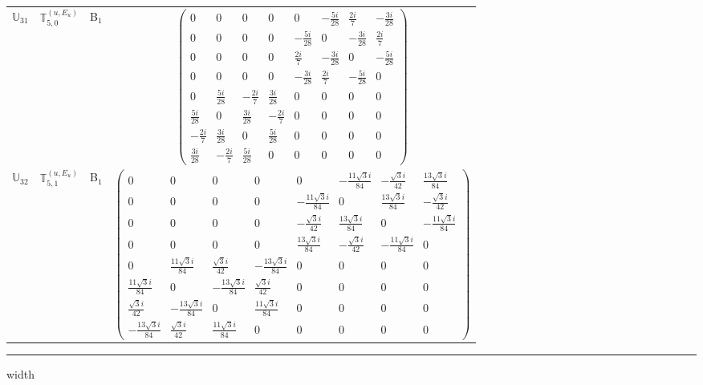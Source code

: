 \documentclass[fleqn,10pt,landscape]{article}
\begin{document}
\begin{itemize}
\begin{center}
\begin{longtable}{c|c|c|c}
$ \mathbb{U}_{31} $ & $\mathbb{T}_{5,0}^{(u,E_{u})}$ & B$_{1}$ & $\begin{pmatrix} 0 & 0 & 0 & 0 & 0 & - \frac{5 i}{28} & \frac{2 i}{7} & - \frac{3 i}{28} \\ 0 & 0 & 0 & 0 & - \frac{5 i}{28} & 0 & - \frac{3 i}{28} & \frac{2 i}{7} \\ 0 & 0 & 0 & 0 & \frac{2 i}{7} & - \frac{3 i}{28} & 0 & - \frac{5 i}{28} \\ 0 & 0 & 0 & 0 & - \frac{3 i}{28} & \frac{2 i}{7} & - \frac{5 i}{28} & 0 \\ 0 & \frac{5 i}{28} & - \frac{2 i}{7} & \frac{3 i}{28} & 0 & 0 & 0 & 0 \\ \frac{5 i}{28} & 0 & \frac{3 i}{28} & - \frac{2 i}{7} & 0 & 0 & 0 & 0 \\ - \frac{2 i}{7} & \frac{3 i}{28} & 0 & \frac{5 i}{28} & 0 & 0 & 0 & 0 \\ \frac{3 i}{28} & - \frac{2 i}{7} & \frac{5 i}{28} & 0 & 0 & 0 & 0 & 0 \end{pmatrix}$ \\
$ \mathbb{U}_{32} $ & $\mathbb{T}_{5,1}^{(u,E_{u})}$ & B$_{1}$ & $\begin{pmatrix} 0 & 0 & 0 & 0 & 0 & - \frac{11 \sqrt{3} i}{84} & - \frac{\sqrt{3} i}{42} & \frac{13 \sqrt{3} i}{84} \\ 0 & 0 & 0 & 0 & - \frac{11 \sqrt{3} i}{84} & 0 & \frac{13 \sqrt{3} i}{84} & - \frac{\sqrt{3} i}{42} \\ 0 & 0 & 0 & 0 & - \frac{\sqrt{3} i}{42} & \frac{13 \sqrt{3} i}{84} & 0 & - \frac{11 \sqrt{3} i}{84} \\ 0 & 0 & 0 & 0 & \frac{13 \sqrt{3} i}{84} & - \frac{\sqrt{3} i}{42} & - \frac{11 \sqrt{3} i}{84} & 0 \\ 0 & \frac{11 \sqrt{3} i}{84} & \frac{\sqrt{3} i}{42} & - \frac{13 \sqrt{3} i}{84} & 0 & 0 & 0 & 0 \\ \frac{11 \sqrt{3} i}{84} & 0 & - \frac{13 \sqrt{3} i}{84} & \frac{\sqrt{3} i}{42} & 0 & 0 & 0 & 0 \\ \frac{\sqrt{3} i}{42} & - \frac{13 \sqrt{3} i}{84} & 0 & \frac{11 \sqrt{3} i}{84} & 0 & 0 & 0 & 0 \\ - \frac{13 \sqrt{3} i}{84} & \frac{\sqrt{3} i}{42} & \frac{11 \sqrt{3} i}{84} & 0 & 0 & 0 & 0 & 0 \end{pmatrix}$ \\
\end{longtable}
\end{center}

 \hfil \hrule height 1mm width \textwidth \hfil


\end{itemize}
\end{document}
